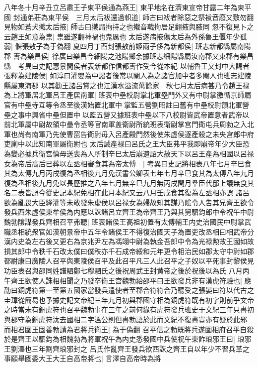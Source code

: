 八年冬十月辛丑立呂肅王子東平侯通為燕王|{
	東平地名在濟東宣帝甘露二年為東平國}
封通弟莊為東平侯　三月太后袚還過軹道|{
	師古曰袚者除惡之祭袚音廢又敷勿翻}
見物如蒼犬撠太后掖|{
	師古曰撠謂拘持之也撠音戟拘居足翻掖與腋同}
忽不復見卜之云趙王如意為祟|{
	祟雖遂翻神禍也鬼厲也}
太后遂病掖傷太后為外孫魯王偃年少孤弱|{
	偃張敖子為于偽翻}
夏四月丁酉封張敖前姬兩子侈為新都侯|{
	班志新都縣屬南陽郡}
夀為樂昌侯|{
	徐廣曰樂昌今細陽之池陽鄉余據班志細陽縣屬汝南郡又東郡有樂昌縣　考異曰史記惠景間侯者表新都作信都夀作受今從本紀}
以輔魯王又封中大謁者張釋為建陵侯|{
	如淳曰灌嬰為中謁者後常以閹人為之諸官加中者多閹人也班志建陵縣屬東海郡}
以其勸王諸呂賞之也江漢水溢流萬餘家　秋七月太后病甚乃令趙王禄為上將軍居北軍呂王產居南軍|{
	班表中壘校尉掌北軍壘門外又有中尉掌徼循京師屬官有中壘寺互等令丞至後漢始置北軍中掌監五營劉昭註曰舊有中壘校尉領北軍營壘之事中興省中壘但置中以監五營又據班表中壘以下八校尉皆武帝置意者武帝以前北軍屬中尉故領中壘令丞等官南軍盖衛尉所統班表衛尉掌宫門衛屯兵周勃之入北軍也尚有南軍乃先使曹窋告衛尉毋入呂產殿門然後使朱虚侯逐產殺之未央宫郎中府吏廁中以此知南軍屬衛尉也}
太后誡產禄曰呂氏之王大臣弗平我即崩帝年少大臣恐為變必據兵衛宫慎毋送喪為人所制辛巳太后崩遺詔大赦天下以呂王產為相國以呂禄女為帝后高后已葬以左丞相審食其為帝太傅　|{
	考異曰史記將相表八年七月辛巳食其為太傅九月丙戌復為丞相後九月免漢書公卿表七年七月辛巳食其為太傅八年九月復為丞相後九月免以長歷推之八年七月無辛巳九月無丙戌閏月羣臣代邸上議無食其名二表皆誤今從史記本紀免相在此月本紀又云八月壬戌食其復為左丞相亦誤}
諸呂欲為亂畏大臣絳灌等未敢發朱虚侯以呂禄女為婦故知其謀乃隂令人吿其兄齊王欲令發兵西朱虚侯東牟侯為内應以誅諸呂立齊王為帝齊王乃與其舅駟鈞郎中令祝午中尉魏勃隂謀發兵齊相召平弗聽|{
	班表諸侯王高祖初置有太傅輔王内史治國民中尉掌武職丞相統衆官如漢朝景帝中五年令諸侯王不得復治國天子為置吏改丞相曰相武帝分漢内史為左右後又更右為京兆尹左為馮翊中尉為執金吾郎中令為光禄勲故王國如故損其郎中令秩千石改太僕曰僕秩亦千石成帝綏和元年更令相治民如郡太守中尉如郡都尉康曰廣陵人召平與東陵侯召平及此召平凡三人此召平之子奴以平死事封黎侯見功臣表召與邵同姓譜駟鄭七穆駟氏之後祝周武王封黄帝之後於祝後以為氏}
八月丙午齊王欲使人誅相相聞之乃發卒衛王宫魏勃紿邵平曰王欲發兵非有漢虎符驗也|{
	應劭曰銅虎符第一至第五國家當發兵遣使者至郡合符符合乃聽受之張晏曰符以代古之圭璋從簡易也予據史記文帝紀三年九月初與郡國守相為銅虎符既有初字則前乎文帝之時當未有銅虎符也召平魏勃事在三年之前何緣有虎符發兵班史于文紀三年只書初與郡守為銅虎符汰去國相二字溫公則但書勃語於此而文紀不復書豈亦有疑於此邪}
而相君圍王固善勃請為君將兵衛王|{
	為于偽翻}
召平信之勃既將兵遂圍相府召平自殺於是齊王以駟鈞為相魏勃為將軍祝午為内史悉發國中兵使祝午東詐琅邪王曰|{
	琅邪王劉澤也三年割齊琅邪封之}
呂氏作亂齊王發兵欲西誅之齊王自以年少不習兵革之事願舉國委大王大王自高帝將也|{
	言澤自高帝時為將}

